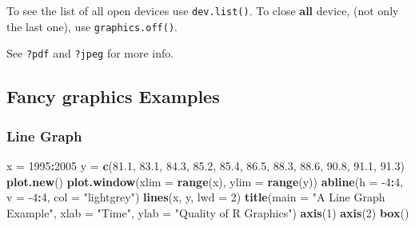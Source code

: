 \documentclass[]{book}
\newenvironment{Shaded}{\begin{snugshade}}{\end{snugshade}}
\newcommand{\CommentTok}[1]{\textcolor[rgb]{0.56,0.35,0.01}{\textit{#1}}}
\newcommand{\DataTypeTok}[1]{\textcolor[rgb]{0.13,0.29,0.53}{#1}}
\newcommand{\DecValTok}[1]{\textcolor[rgb]{0.00,0.00,0.81}{#1}}
\newcommand{\FloatTok}[1]{\textcolor[rgb]{0.00,0.00,0.81}{#1}}
\newcommand{\KeywordTok}[1]{\textcolor[rgb]{0.13,0.29,0.53}{\textbf{#1}}}
\newcommand{\NormalTok}[1]{#1}
\newcommand{\OperatorTok}[1]{\textcolor[rgb]{0.81,0.36,0.00}{\textbf{#1}}}
\newcommand{\StringTok}[1]{\textcolor[rgb]{0.31,0.60,0.02}{#1}}
\theoremstyle{definition}
\theoremstyle{definition}
\theoremstyle{definition}
\theoremstyle{remark}
\begin{document}
\begin{Shaded}
\end{Shaded}

To see the list of all open devices use \texttt{dev.list()}.
To close \textbf{all} device, (not only the last one), use \texttt{graphics.off()}.

See \texttt{?pdf} and \texttt{?jpeg} for more info.

\hypertarget{fancy}{%
\subsection{Fancy graphics Examples}\label{fancy}}

\hypertarget{line-graph}{%
\subsubsection{Line Graph}\label{line-graph}}

\begin{Shaded}
\begin{Highlighting}[]
\NormalTok{x =}\StringTok{ }\DecValTok{1995}\OperatorTok{:}\DecValTok{2005}
\NormalTok{y =}\StringTok{ }\KeywordTok{c}\NormalTok{(}\FloatTok{81.1}\NormalTok{, }\FloatTok{83.1}\NormalTok{, }\FloatTok{84.3}\NormalTok{, }\FloatTok{85.2}\NormalTok{, }\FloatTok{85.4}\NormalTok{, }\FloatTok{86.5}\NormalTok{, }\FloatTok{88.3}\NormalTok{, }\FloatTok{88.6}\NormalTok{, }\FloatTok{90.8}\NormalTok{, }\FloatTok{91.1}\NormalTok{, }\FloatTok{91.3}\NormalTok{)}
\KeywordTok{plot.new}\NormalTok{()}
\KeywordTok{plot.window}\NormalTok{(}\DataTypeTok{xlim =} \KeywordTok{range}\NormalTok{(x), }\DataTypeTok{ylim =} \KeywordTok{range}\NormalTok{(y))}
\KeywordTok{abline}\NormalTok{(}\DataTypeTok{h =} \DecValTok{-4}\OperatorTok{:}\DecValTok{4}\NormalTok{, }\DataTypeTok{v =} \DecValTok{-4}\OperatorTok{:}\DecValTok{4}\NormalTok{, }\DataTypeTok{col =} \StringTok{"lightgrey"}\NormalTok{)}
\KeywordTok{lines}\NormalTok{(x, y, }\DataTypeTok{lwd =} \DecValTok{2}\NormalTok{)}
\KeywordTok{title}\NormalTok{(}\DataTypeTok{main =} \StringTok{"A Line Graph Example"}\NormalTok{,}
        \DataTypeTok{xlab =} \StringTok{"Time"}\NormalTok{,}
        \DataTypeTok{ylab =} \StringTok{"Quality of R Graphics"}\NormalTok{)}
\KeywordTok{axis}\NormalTok{(}\DecValTok{1}\NormalTok{)}
\KeywordTok{axis}\NormalTok{(}\DecValTok{2}\NormalTok{)}
\KeywordTok{box}\NormalTok{()}
\end{Highlighting}
\end{Shaded}
\end{document}
